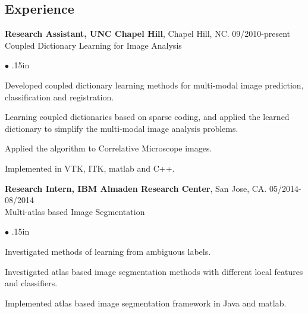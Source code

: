 \documentclass[line,margin]{res}
\newenvironment{bullets}{\begin{list}{\tiny$\bullet$}{\topsep 0pt \itemsep -2pt \leftmargin .15in}}{\vspace*{4pt}\end{list}}
\begin{document}
\begin{resume}
\vspace{-.05in}
\section{\sc Experience}
\smallskip

\textbf{Research Assistant, UNC Chapel Hill}, Chapel Hill, NC.  \hfill      09/2010-present \\
Coupled Dictionary Learning for Image Analysis %
\begin{bullets}
	\item Developed coupled dictionary learning methods for multi-modal image prediction, classification and registration.
	\item Learning coupled dictionaries based on sparse coding, and applied the learned dictionary to simplify the multi-modal image analysis problems.
	\item Applied the algorithm to Correlative Microscope images.
	\item Implemented in VTK, ITK, matlab and C++.
\end{bullets}
\vspace{-.1in}


\textbf{Research Intern, IBM Almaden Research Center}, San Jose, CA. \hfill      05/2014-08/2014 \\
Multi-atlas based Image Segmentation
\begin{bullets} 
\item Investigated methods of learning from ambiguous labels.
\item Investigated atlas based image segmentation methods with different local features and classifiers.
\item Implemented atlas based image segmentation framework in Java and matlab.
\end{bullets}
\vspace{-.1in}


\end{resume}
\end{document}
